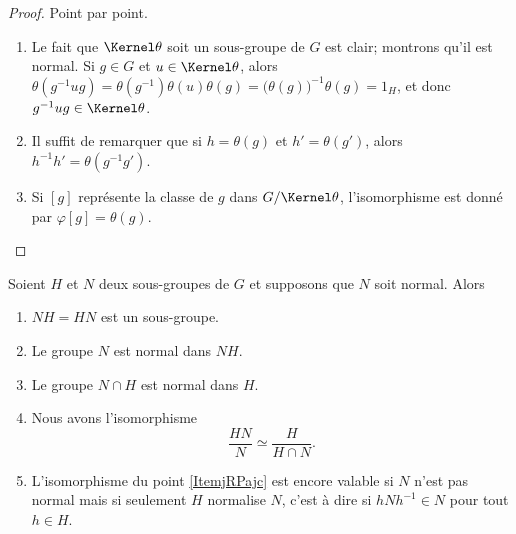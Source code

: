 \begin{proof}
    Point par point.
    \begin{enumerate}
        \item
            Le fait que  \( \Kernel\theta\) soit un sous-groupe de \( G\) est clair; montrons qu'il est normal. Si \( g \in G \) et \( u \in \Kernel\theta\), alors \(\theta (g^{-1} u g) = \theta(g^{-1})\theta(u)\theta(g) = \bigl(\theta(g)\bigr)^{-1}\theta(g) = 1_H \), et donc \( g^{-1} u g \in \Kernel\theta\).
        \item
            Il suffit de remarquer que si \( h = \theta(g) \) et \( h' = \theta(g') \), alors \( h^{-1} h' = \theta(g^{-1} g') \).
        \item
            Si \( [g]\) représente la classe de \( g\) dans \( G/\Kernel\theta\), l'isomorphisme est donné par \( \varphi[g]=\theta(g)\).
    \end{enumerate}
\end{proof}


\begin{theorem}
    Soient \( H\) et \( N\) deux sous-groupes de \( G\) et supposons que \( N\) soit normal. Alors
    \begin{enumerate}
        \item
            \( NH=HN\) est un sous-groupe.
        \item
            Le groupe \( N\) est normal dans \( NH\).
        \item
            Le groupe \( N\cap H\) est normal dans \( H\).

        \item\label{ItemjRPajc}
            Nous avons l'isomorphisme
            \begin{equation}
                \frac{ HN }{ N }\simeq\frac{ H }{ H\cap N }.
            \end{equation}
        \item   \label{ItembgDQEN}
            L'isomorphisme du point \ref{ItemjRPajc} est encore valable si \( N\) n'est pas normal mais si seulement \( H\) normalise \( N\), c'est à dire si \( hNh^{-1}\in N\) pour tout \( h\in H\).
    \end{enumerate}
\end{theorem}

